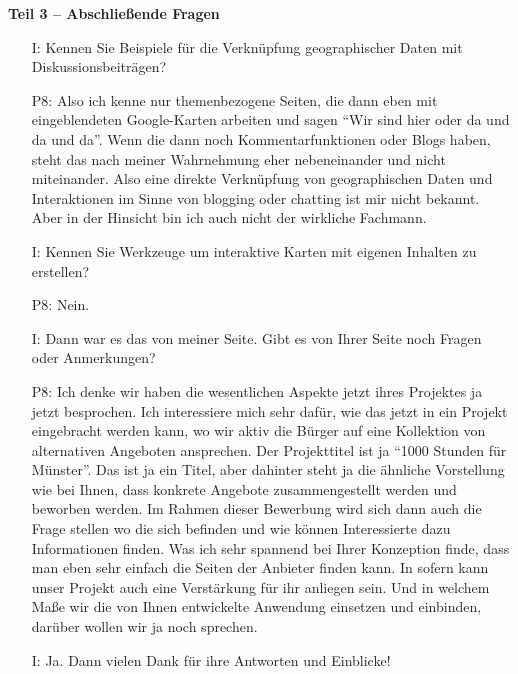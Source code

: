 \textbf{Teil 3 -- Abschlie{\ss}ende Fragen}
\begin{itemize}
    \item[I:] Kennen Sie Beispiele f{\"u}r die Verkn{\"u}pfung geographischer Daten mit Diskussionsbeitr{\"a}gen?
    \item[P8:] Also ich kenne nur themenbezogene Seiten, die dann eben mit eingeblendeten Google-Karten arbeiten und sagen "`Wir sind hier oder da und da und da"'. Wenn die dann noch Kommentarfunktionen oder Blogs haben, steht das nach meiner Wahrnehmung eher nebeneinander und nicht miteinander. Also eine direkte Verkn{\"u}pfung von geographischen Daten und Interaktionen im Sinne von blogging oder chatting ist mir nicht bekannt. Aber in der Hinsicht bin ich auch nicht der wirkliche Fachmann.
    \item[I:] Kennen Sie Werkzeuge um interaktive Karten mit eigenen Inhalten zu erstellen?
    \item[P8:] Nein.
    \item[I:] Dann war es das von meiner Seite. Gibt es von Ihrer Seite noch Fragen oder Anmerkungen?
    \item[P8:] Ich denke wir haben die wesentlichen Aspekte jetzt ihres Projektes ja jetzt besprochen. Ich interessiere mich sehr daf{\"u}r, wie das jetzt in ein Projekt eingebracht werden kann, wo wir aktiv die B{\"u}rger auf eine Kollektion von alternativen Angeboten ansprechen. Der Projekttitel ist ja "`1000 Stunden f{\"u}r M{\"u}nster"'. Das ist ja ein Titel, aber dahinter steht ja die {\"a}hnliche Vorstellung wie bei Ihnen, dass konkrete Angebote zusammengestellt werden und beworben werden. Im Rahmen dieser Bewerbung wird sich dann auch die Frage stellen wo die sich befinden und wie k{\"o}nnen Interessierte dazu Informationen finden. Was ich sehr spannend bei Ihrer Konzeption finde, dass man eben sehr einfach die Seiten der Anbieter finden kann. In sofern kann unser Projekt auch eine Verst{\"a}rkung f{\"u}r ihr anliegen sein. Und in welchem Ma{\ss}e wir die von Ihnen entwickelte Anwendung einsetzen und einbinden, dar{\"u}ber wollen wir ja noch sprechen.
    \item[I:] Ja. Dann vielen Dank f{\"u}r ihre Antworten und Einblicke!
\end{itemize}